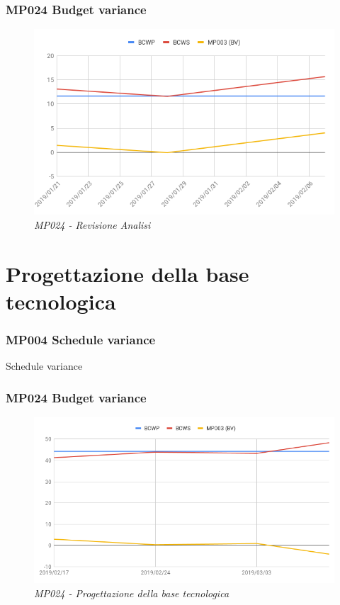 \subsubsection{MP024 Budget variance}
\begin{figure} [h]
    \centering
	\includegraphics[scale=0.5]{./images/bvra.png}
	\caption{\textit{MP024 - Revisione Analisi}}\label{}
\end{figure}

\section{Progettazione della base tecnologica}
\label{progettazione}
\subsubsection{MP004 Schedule variance}
Schedule variance

\subsubsection{MP024 Budget variance}
\begin{figure} [h]
    \centering
	\includegraphics[scale=0.5]{./images/bvp.png}
	\caption{\textit{MP024 - Progettazione della base tecnologica}}\label{}
\end{figure}

